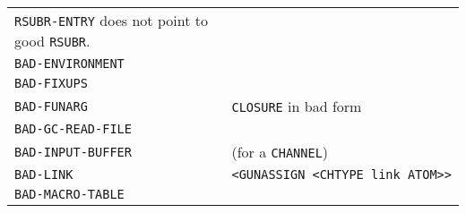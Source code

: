 \documentclass[a4paper,]{article}
\begin{document}
\begin{longtable}[]{@{}ll@{}}
\begin{minipage}[t]{0.36\columnwidth}
\texttt{RSUBR-ENTRY} does not point to good \texttt{RSUBR}.\strut
\end{minipage}\tabularnewline
\begin{minipage}[t]{0.58\columnwidth}\raggedright\strut
\texttt{BAD-ENVIRONMENT}\strut
\end{minipage} & \begin{minipage}[t]{0.36\columnwidth}\raggedright\strut
\strut
\end{minipage}\tabularnewline
\begin{minipage}[t]{0.58\columnwidth}\raggedright\strut
\texttt{BAD-FIXUPS}\strut
\end{minipage} & \begin{minipage}[t]{0.36\columnwidth}\raggedright\strut
\strut
\end{minipage}\tabularnewline
\begin{minipage}[t]{0.58\columnwidth}\raggedright\strut
\texttt{BAD-FUNARG}\strut
\end{minipage} & \begin{minipage}[t]{0.36\columnwidth}\raggedright\strut
\texttt{CLOSURE} in bad form\strut
\end{minipage}\tabularnewline
\begin{minipage}[t]{0.58\columnwidth}\raggedright\strut
\texttt{BAD-GC-READ-FILE}\strut
\end{minipage} & \begin{minipage}[t]{0.36\columnwidth}\raggedright\strut
\strut
\end{minipage}\tabularnewline
\begin{minipage}[t]{0.58\columnwidth}\raggedright\strut
\texttt{BAD-INPUT-BUFFER}\strut
\end{minipage} & \begin{minipage}[t]{0.36\columnwidth}\raggedright\strut
(for a \texttt{CHANNEL})\strut
\end{minipage}\tabularnewline
\begin{minipage}[t]{0.58\columnwidth}\raggedright\strut
\texttt{BAD-LINK}\strut
\end{minipage} & \begin{minipage}[t]{0.36\columnwidth}\raggedright\strut
\texttt{\textless{}GUNASSIGN\ \textless{}CHTYPE\ link\ ATOM\textgreater{}\textgreater{}}\strut
\end{minipage}\tabularnewline
\begin{minipage}[t]{0.58\columnwidth}\raggedright\strut
\texttt{BAD-MACRO-TABLE}\strut
\end{minipage} & \begin{minipage}[t]{0.36\columnwidth}\raggedright\strut

\end{minipage}
\end{longtable}
\end{document}
